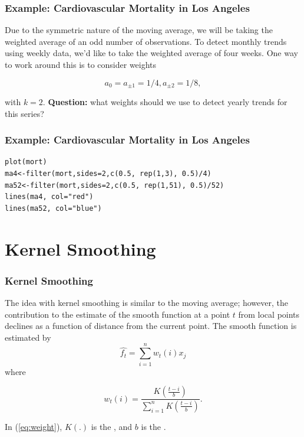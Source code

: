 \documentclass[%
xcolor=pdftex]{beamer}
\begin{document}
\begin{frame}
\frametitle{Example: Cardiovascular Mortality in Los Angeles}

Due to the symmetric nature of the moving average, we will be taking the weighted average of an odd number of observations. To detect monthly trends using weekly data, we'd like to take the weighted average of four weeks. One way to work around this is to consider weights

$$
a_0 = a_{\pm1} = 1/4, a_{\pm2} = 1/8,
$$

with $k=2$. \textbf{Question:} what weights should we use to detect yearly trends for this series?

\end{frame}

\begin{frame}[fragile]
\frametitle{Example: Cardiovascular Mortality in Los Angeles}

\begin{verbatim}
plot(mort)
ma4<-filter(mort,sides=2,c(0.5, rep(1,3), 0.5)/4)
ma52<-filter(mort,sides=2,c(0.5, rep(1,51), 0.5)/52)
lines(ma4, col="red")
lines(ma52, col="blue")
\end{verbatim}

\end{frame}

\section{Kernel Smoothing}
\frame{\tableofcontents[currentsection]}

\begin{frame}
\frametitle{Kernel Smoothing}

The idea with kernel smoothing is similar to the moving average; however, the contribution to the estimate of the smooth function at a point $t$ from local points declines as a function of distance from the current point.  The smooth function is estimated by
\begin{equation}
\hat{f_t}=\sum_{i=1}^n w_t(i) x_j
\end{equation}
where

\begin{equation} \label{eq:weight}
w_t(i)=\frac{K\left( \frac{t-i}{b} \right)}{ \sum_{i=1}^n K\left( \frac{t-i}{b} \right)}.
\end{equation}

In (\ref{eq:weight}), $K(.)$ is the \underline{\hspace{28 mm}}, and $b$ is the \underline{\hspace{20 mm}}.

\end{frame}
\end{document}
